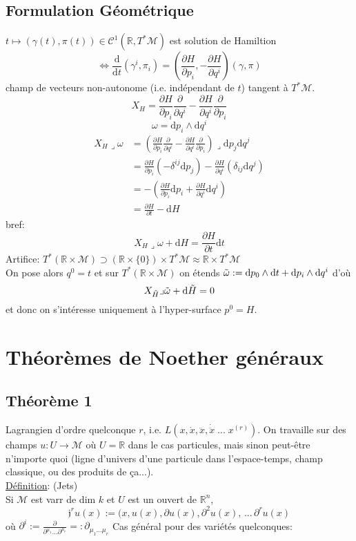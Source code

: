 \documentclass[a4paper,11pt]{article}
\renewcommand{\d}{{\mathrm{d}}}
\newcommand{\dr}[2]{\frac{\partial {#1}}{\partial{#2}}}
\begin{document}
\subsection{Formulation Géométrique}
$t\mapsto (\gamma(t), \pi(t)) \in \mathcal{C}^1(\mathbb{R},T^*\mathcal{M})$ est solution de Hamiltion
$$\iff \frac{\d}{\d t}(\gamma^i, \pi_i) = (\dr H{p_i},-\dr H{q^i})(\gamma,\pi)$$
champ de vecteurs \color{red} non-autonome (i.e. indépendant de $t$) \color{black} tangent à $T^*\mathcal{M}$.
$$X_H = \dr H{p_i} \dr{}{q^i}-\dr H{q^i}\dr{}{p_i}$$
$$\omega = \d p_i \wedge \d q^i$$
\begin{align*}
X_H \lrcorner \omega
&= \left(\dr H{p_i} \dr{}{q^i}-\dr H{q^i}\dr{}{p_i}\right) \lrcorner \d p_j\d q^j\\
&= \dr H {p_i} (-\delta^{ij} \d p_j) - \dr H {q^i}(\delta_{ij}\d q^j)\\
&= - \left(\dr H {p_i} \d p_i + \dr H {q^i} \d q^i\right)\\
&=\dr H t - \d H
\end{align*}
bref:
$$\boxed{X_H \lrcorner \omega + \d H = \dr H t \d t}$$
Artifice: $T^*(\mathbb{R}\times\mathcal{M}) \supset (\mathbb{R}\times\{0\})\times T^*\mathcal{M}\approx\mathbb{R}\times T^*\mathcal{M} $
\\
On pose alors $q^0 = t$ et sur $T^*(\mathbb{R}\times\mathcal{M})$ on étends $\Tilde \omega:= \d p_0 \wedge \d t + \d p_i \wedge \d q^i$ d'où
$$X_{\Tilde H} \lrcorner \Tilde \omega + \d \Tilde H=0$$
et donc on s'intéresse uniquement à l'hyper-surface $p^0 = H$.

\section{Théorèmes de Noether généraux}
\subsection{Théorème 1}
Lagrangien d'ordre quelconque $r$, i.e. $L(x, \dot x, \ddot x, \dot{\ddot x}\;...\; x^{(r)})$. On travaille sur des champs $u:U\to\mathcal{M}$ où $U=\mathbb{R}$ dans le cas particules, mais sinon peut-être n'importe quoi (ligne d'univers d'une particule dans l'espace-temps, champ classique, ou des produits de ça...).
\\
\underline{Définition}: (Jets)\\
Si $\mathcal{M}$ est varr de dim $k$ et $U$ est un ouvert de $\mathbb{R}^n$, 
$$\mathfrak{j}^r u (x) := (x, u(x), \partial u(x), \partial^2 u(x), \,...\, \partial^r u (x)$$
où $\partial^i := \dr{}{^{\mu_1}...\partial^{\mu_r}} =: \partial_{\mu_1...\mu_r}$
Cas général pour des variétés quelconques:
\end{document}
